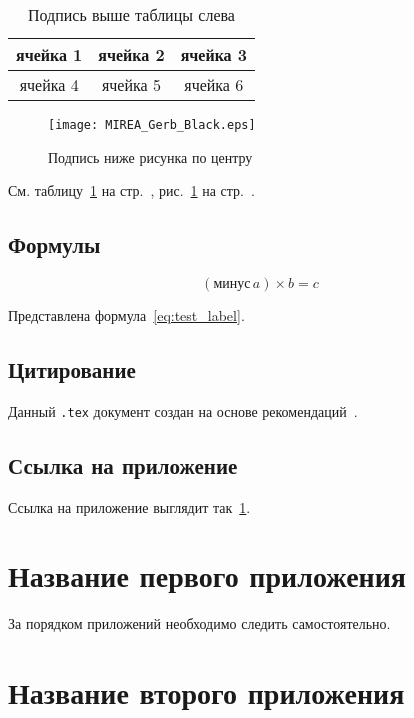 \documentclass[14pt, a4paper, titlepage]{extarticle}
\renewcommand{\thesection}{\Asbuk{section}}
\let\oldsec\section
\renewcommand{\section}{\addtocounter{section}{1}\oldsec[\appendixname~\thesection]}
\begin{document}
\begin{table}[htb]
    \caption{Подпись выше таблицы слева}
    \begin{tabular}{ |c|c|c| } 
        \hline
        ячейка 1 & ячейка 2 & ячейка 3 \\ \hline
        ячейка 4 & ячейка 5 & ячейка 6 \\ \hline
    \end{tabular}
    \label{tab:test_label}
\end{table}
 
\begin{figure}[htb]
    \centering
    \texttt{[image: MIREA\_Gerb\_Black.eps]}
    \caption{Подпись ниже рисунка по центру}
    \label{fig:test_label}
\end{figure}
 
См. таблицу~\ref{tab:test_label} на стр.~\pageref{tab:test_label}, рис.~\ref{fig:test_label} на стр.~\pageref{fig:test_label}.

\subsection{Формулы}

\begin{equation}\label{eq:test_label}
    (\text{минус}\,a)\times b=c
\end{equation}

Представлена формула~\ref{eq:test_label}.

\subsection{Цитирование}

Данный \verb".tex" документ создан на основе рекомендаций~\parencite{bib:recomendations}.

\subsection{Ссылка на приложение}

Ссылка на приложение выглядит так~\ref{appendix:test_label}.


\clearpage
{}
\printbibliography[title={Список использованных источников}]


\appendix

\section{Название первого приложения}
\label{appendix:test_label}

За порядком приложений необходимо следить самостоятельно.

\section{Название второго приложения}
\end{document}
